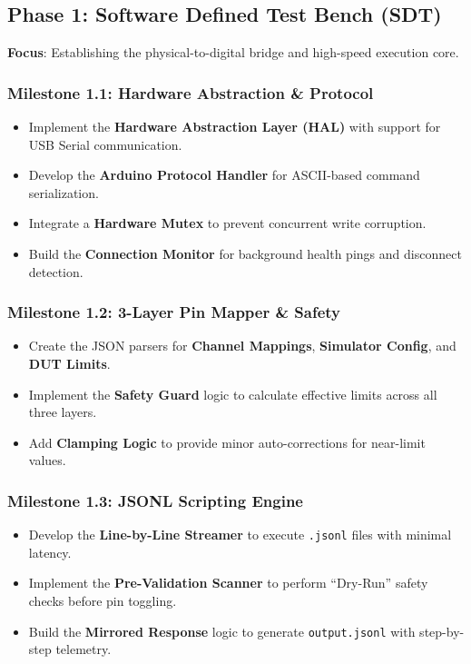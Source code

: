 \documentclass[conference]{IEEEtran}
\begin{document}
\subsection{Phase 1: Software Defined Test Bench (SDT)}
\textbf{Focus}: Establishing the physical-to-digital bridge and high-speed execution core.
\subsubsection{Milestone 1.1: Hardware Abstraction \& Protocol}
\begin{itemize}
    \item Implement the \textbf{Hardware Abstraction Layer (HAL)} with support for USB Serial communication.
    \item Develop the \textbf{Arduino Protocol Handler} for ASCII-based command serialization.
    \item Integrate a \textbf{Hardware Mutex} to prevent concurrent write corruption.
    \item Build the \textbf{Connection Monitor} for background health pings and disconnect detection.
\end{itemize}
\subsubsection{Milestone 1.2: 3-Layer Pin Mapper \& Safety}
\begin{itemize}
    \item Create the JSON parsers for \textbf{Channel Mappings}, \textbf{Simulator Config}, and \textbf{DUT Limits}.
    \item Implement the \textbf{Safety Guard} logic to calculate effective limits across all three layers.
    \item Add \textbf{Clamping Logic} to provide minor auto-corrections for near-limit values.
\end{itemize}
\subsubsection{Milestone 1.3: JSONL Scripting Engine}
\begin{itemize}
    \item Develop the \textbf{Line-by-Line Streamer} to execute \texttt{.jsonl} files with minimal latency.
    \item Implement the \textbf{Pre-Validation Scanner} to perform ``Dry-Run'' safety checks before pin toggling.
    \item Build the \textbf{Mirrored Response} logic to generate \texttt{output.jsonl} with step-by-step telemetry.
\end{itemize}
\end{document}
